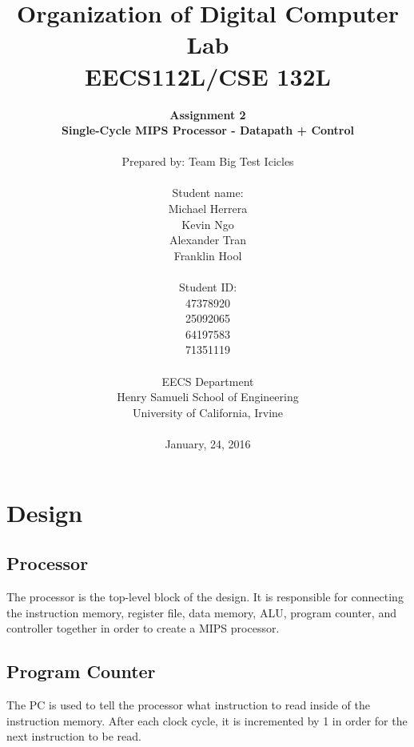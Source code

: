 \documentclass{article}
\begin{document}
\title{Organization of Digital Computer Lab \\ EECS112L/CSE 132L}
\author{\textbf{Assignment 2 }\\ \textbf{Single-Cycle MIPS Processor - Datapath + Control} \\ \\
Prepared by: Team Big Test Icicles \\ \\ Student name: \\ Michael Herrera \\ Kevin Ngo \\ Alexander Tran \\ Franklin Hool \\ \\ Student ID: \\ 47378920 \\ 25092065 \\ 64197583 \\ 71351119 \\ \\ 
EECS Department\\ Henry Samueli School of Engineering \\ University of California, Irvine \\ \\
{January, 24, 2016}} 


\date{}
\maketitle


\section{Design}

	\subsection{Processor}
	The processor is the top-level block of the design. It is responsible for connecting the instruction memory, register file, data memory, ALU, program counter, and controller together in order to create a MIPS processor.  
	
	\subsection{Program Counter}
	The PC is used to tell the processor what instruction to read inside of the instruction memory. After each clock cycle, it is incremented by 1 in order for the next instruction to be read. 
	
\end{document}
